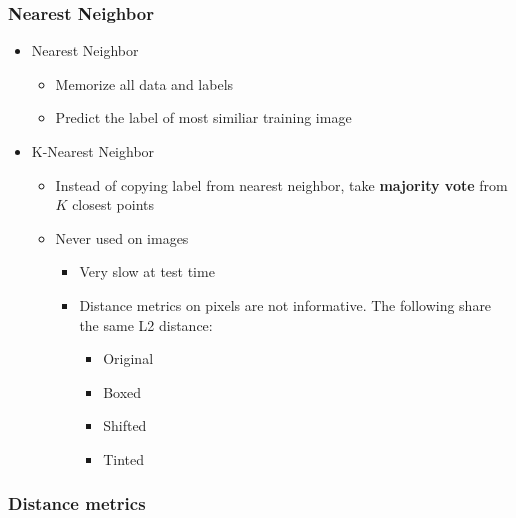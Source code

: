 \documentclass{scrartcl}
\begin{document}
\subsubsection{Nearest Neighbor}

\begin{itemize}
	\item Nearest Neighbor
	\begin{itemize}
		\item Memorize all data and labels
		\item Predict the label of most similiar training image
	\end{itemize}
	\item K-Nearest Neighbor
	\begin{itemize}
		\item Instead of copying label from nearest neighbor, take \textbf{majority vote} from $ K $ closest points
		\item Never used on images
		\begin{itemize}
			\item Very slow at test time
			\item Distance metrics on pixels are not informative. The following share the same L2 distance:
			\begin{itemize}
				\item Original
				\item Boxed
				\item Shifted
				\item Tinted
			\end{itemize}
		\end{itemize}
	\end{itemize}
\end{itemize}

\subsubsection{Distance metrics}
\end{document}

